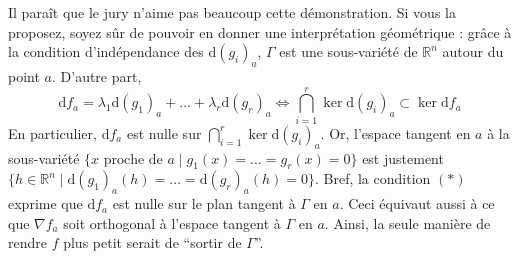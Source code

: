 	\begin{remark}
		Il paraît que le jury n'aime pas beaucoup cette démonstration. Si vous la proposez, soyez sûr de pouvoir en donner une interprétation géométrique : grâce à la condition d'indépendance des $\mathrm{d}(g_i)_a$, $\Gamma$ est une sous-variété de $\mathbb{R}^n$ autour du point $a$. D'autre part,
		\[ \mathrm{d}f_a = \lambda_1 \mathrm{d}(g_1)_a + \dots + \lambda_r \mathrm{d}(g_r)_a \iff \bigcap_{i=1}^r \ker{\mathrm{d}(g_i)_a} \subset \ker{\mathrm{d}f_a} \tag{$*$} \]
		En particulier, $\mathrm{d}f_a$ est nulle sur $\bigcap_{i=1}^r \ker{\mathrm{d}(g_i)_a}$. Or, l'espace tangent en $a$ à la sous-variété $\{ x \text{ proche de } a \mid g_1(x) = \dots = g_r(x) = 0 \}$ est justement $\{ h \in \mathbb{R}^n \mid \mathrm{d}(g_1)_a(h) = \dots = \mathrm{d}(g_r)_a(h) = 0 \}$.
		\newpar
		Bref, la condition $(*)$ exprime que $\mathrm{d}f_a$ est nulle sur le plan tangent à $\Gamma$ en $a$. Ceci équivaut aussi à ce que $\nabla f_a$ soit orthogonal à l'espace tangent à $\Gamma$ en $a$. Ainsi, la seule manière de rendre $f$ plus petit serait de ``sortir de $\Gamma$''.
	\end{remark}

